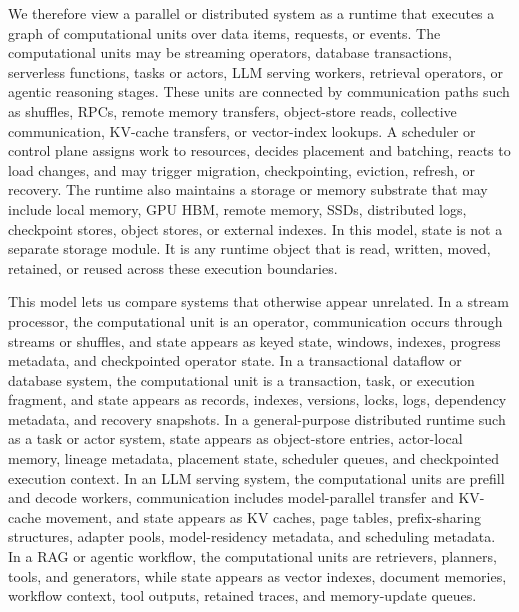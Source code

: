 \documentclass[acmsmall,screen,review]{acmart}
\begin{document}
We therefore view a parallel or distributed system as a runtime that executes a graph of computational units over data items, requests, or events. The computational units may be streaming operators, database transactions, serverless functions, tasks or actors, LLM serving workers, retrieval operators, or agentic reasoning stages. These units are connected by communication paths such as shuffles, RPCs, remote memory transfers, object-store reads, collective communication, KV-cache transfers, or vector-index lookups. A scheduler or control plane assigns work to resources, decides placement and batching, reacts to load changes, and may trigger migration, checkpointing, eviction, refresh, or recovery. The runtime also maintains a storage or memory substrate that may include local memory, GPU HBM, remote memory, SSDs, distributed logs, checkpoint stores, object stores, or external indexes. In this model, state is not a separate storage module. It is any runtime object that is read, written, moved, retained, or reused across these execution boundaries.

This model lets us compare systems that otherwise appear unrelated. In a stream processor, the computational unit is an operator, communication occurs through streams or shuffles, and state appears as keyed state, windows, indexes, progress metadata, and checkpointed operator state. In a transactional dataflow or database system, the computational unit is a transaction, task, or execution fragment, and state appears as records, indexes, versions, locks, logs, dependency metadata, and recovery snapshots. In a general-purpose distributed runtime such as a task or actor system, state appears as object-store entries, actor-local memory, lineage metadata, placement state, scheduler queues, and checkpointed execution context. In an LLM serving system, the computational units are prefill and decode workers, communication includes model-parallel transfer and KV-cache movement, and state appears as KV caches, page tables, prefix-sharing structures, adapter pools, model-residency metadata, and scheduling metadata. In a RAG or agentic workflow, the computational units are retrievers, planners, tools, and generators, while state appears as vector indexes, document memories, workflow context, tool outputs, retained traces, and memory-update queues.
\end{document}
